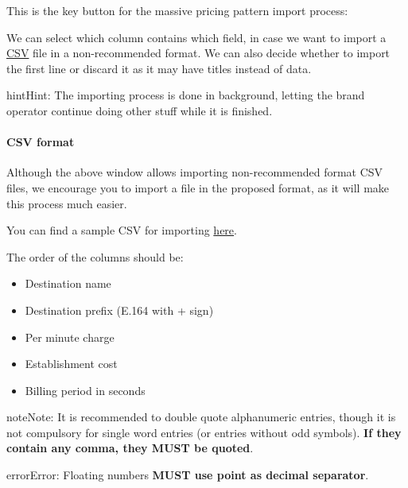 \documentclass[letterpaper,10pt,english]{sphinxmanual}
\begin{document}
This is the key button for the massive pricing pattern import process:

\noindent{}

We can select which column contains which field, in case we want to import a
\href{https://es.wikipedia.org/wiki/CSV}{CSV} file in a non-recommended format. We
can also decide whether to import the first line or discard it as it may have
titles instead of data.

\begin{notice}{hint}{Hint:}
The importing process is done in background, letting the brand operator
continue doing other stuff while it is finished.
\end{notice}


\paragraph{CSV format}
\label{brand/billing/destination_rates:csv-format}
Although the above window allows importing non-recommended format CSV files,
we encourage you to import a file in the proposed format, as it will make
this process much easier.

You can find a sample CSV for importing \href{https://raw.githubusercontent.com/irontec/ivozprovider/artemis/web/admin/samples/pricesSample.csv}{here}.

The order of the columns should be:
\begin{itemize}
\item {} 
Destination name

\item {} 
Destination prefix (E.164 with + sign)

\item {} 
Per minute charge

\item {} 
Establishment cost

\item {} 
Billing period in seconds

\end{itemize}

\begin{notice}{note}{Note:}
It is recommended to double quote alphanumeric entries, though
it is not compulsory for single word entries (or entries without odd symbols).
\textbf{If they contain any comma, they MUST be quoted}.
\end{notice}

\begin{notice}{error}{Error:}
Floating numbers \textbf{MUST use point as decimal separator}.
\end{notice}
\end{document}
